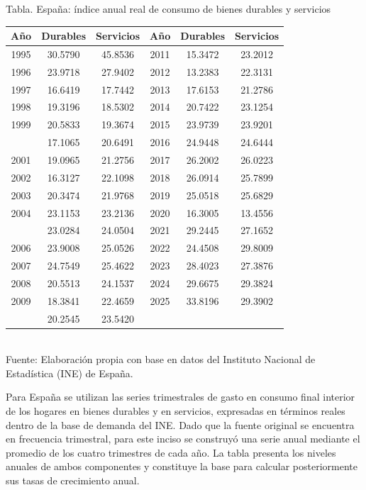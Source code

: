 \documentclass{article}\usepackage[]{graphicx}\usepackage[]{xcolor}
\begin{document}
\begin{center}
Tabla. España: índice anual real de consumo de bienes durables y servicios
\end{center}
\begin{center}

\begin{tabular}{cccccc}
\toprule
Año & Durables & Servicios & Año & Durables & Servicios\\
\midrule
1995 & 30.5790 & 45.8536 & 2011 & 15.3472 & 23.2012\\
1996 & 23.9718 & 27.9402 & 2012 & 13.2383 & 22.3131\\
1997 & 16.6419 & 17.7442 & 2013 & 17.6153 & 21.2786\\
1998 & 19.3196 & 18.5302 & 2014 & 20.7422 & 23.1254\\
1999 & 20.5833 & 19.3674 & 2015 & 23.9739 & 23.9201\\
\addlinespace
2000 & 17.1065 & 20.6491 & 2016 & 24.9448 & 24.6444\\
2001 & 19.0965 & 21.2756 & 2017 & 26.2002 & 26.0223\\
2002 & 16.3127 & 22.1098 & 2018 & 26.0914 & 25.7899\\
2003 & 20.3474 & 21.9768 & 2019 & 25.0518 & 25.6829\\
2004 & 23.1153 & 23.2136 & 2020 & 16.3005 & 13.4556\\
\addlinespace
2005 & 23.0284 & 24.0504 & 2021 & 29.2445 & 27.1652\\
2006 & 23.9008 & 25.0526 & 2022 & 24.4508 & 29.8009\\
2007 & 24.7549 & 25.4622 & 2023 & 28.4023 & 27.3876\\
2008 & 20.5513 & 24.1537 & 2024 & 29.6675 & 29.3824\\
2009 & 18.3841 & 22.4659 & 2025 & 33.8196 & 29.3902\\
\addlinespace
2010 & 20.2545 & 23.5420 &  &  & \\
\bottomrule
\end{tabular}
\\[0.3em]
{\footnotesize Fuente: Elaboración propia con base en datos del Instituto Nacional de Estadística (INE) de España.}
\end{center}


Para España se utilizan las series trimestrales de gasto en consumo final interior de los hogares en bienes durables y en servicios, expresadas en términos reales dentro de la base de demanda del INE. Dado que la fuente original se encuentra en frecuencia trimestral, para este inciso se construyó una serie anual mediante el promedio de los cuatro trimestres de cada año. La tabla presenta los niveles anuales de ambos componentes y constituye la base para calcular posteriormente sus tasas de crecimiento anual.
\end{document}
